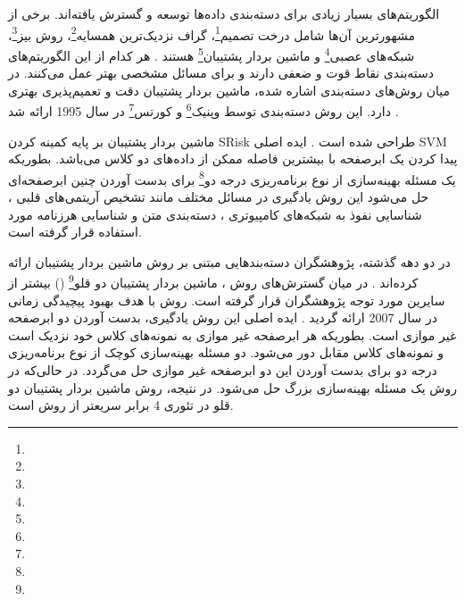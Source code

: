 الگوریتم‌های بسیار زیادی برای دسته‌بندی داده‌ها توسعه و گسترش یافته‌اند. برخی از مشهورترین آن‌ها شامل درخت تصمیم\footnote{}، گراف نزدیک‌ترین همسایه\footnote{}، روش بیز\footnote{}، شبکه‌های عصبی\footnote{} و ماشین بردار پشتیبان\footnote{} هستند \cite{kotsiantis2007}. هر کدام از این الگوریتم‌های دسته‌بندی نقاط قوت و ضعفی دارند و برای مسائل مشخصی بهتر عمل می‌کنند. در میان روش‌های دسته‌بندی اشاره شده، ماشین بردار پشتیبان دقت و تعمیم‌پذیری بهتری دارد. این روش دسته‌بندی توسط وپنیک\footnote{} و کورتس\footnote{} در سال 1995 ارائه شد \cite{vapnik1995}. 

ماشین بردار پشتیبان بر پایه کمینه کردن \gls{SRisk} طراحی شده است \cite{vapnik1998}. ایده اصلی \gls*{SVM} پیدا کردن یک ابرصفحه با بیشترین فاصله ممکن از داده‌های دو کلاس می‌باشد. بطوریکه یک مسئله  بهینه‌سازی از نوع برنامه‌ریزی درجه دو\footnote{} برای بدست آوردن چنین ابرصفحه‌ای حل می‌شود این روش یادگیری در مسائل مختلف مانند تشخیص آریتمی‌های قلبی \cite{nasiri2009}، شناسایی نفوذ به شبکه‌های کامپیوتری \cite{raman2017}، دسته‌بندی متن\cite{lee2012} و شناسایی هرزنامه \cite{zoubi2018} مورد استفاده قرار گرفته است.

در دو دهه گذشته، پژوهشگران دسته‌بندهایی مبتنی بر روش ماشین بردار پشتیبان ارائه کرده‌اند \cite{nayak2015}. در میان گسترش‌های روش ، ماشین بردار پشتیبان دو قلو\footnote{}  () بیشتر از سایرین مورد توجه پژوهشگران قرار گرفته است. روش  با هدف بهبود پیچیدگی زمانی   در سال 2007 ارائه گردید \cite{jayadeva2007}. ایده اصلی این روش یادگیری، بدست آوردن دو ابرصفحه غیر موازی است. بطوریکه هر ابرصفحه غیر موازی به نمونه‌های کلاس خود نزدیک است و نمونه‌های کلاس مقابل دور می‌شود. دو مسئله بهینه‌سازی کوچک از نوع برنامه‌ریزی درجه دو برای بدست آوردن این دو ابرصفحه غیر موازی حل می‌گردد. در حالی‌که در روش  یک مسئله بهینه‌سازی بزرگ حل می‌شود. در نتیجه، روش ماشین بردار پشتیبان دو قلو در تئوری 4 برابر سریعتر از روش  است.




